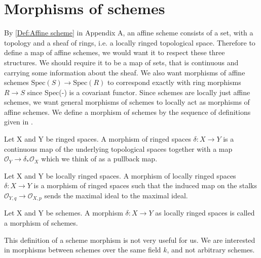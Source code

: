 \section{Morphisms of schemes}
%
By \cref{Def:Affine scheme} in Appendix A, an affine scheme consists of a set, with a topology and a sheaf of rings, i.e. a locally ringed topological space. Therefore to define a map of affine schemes, we would want it to respect these three structures. We should require it to be a map of sets, that is continuous and carrying some information about the sheaf. We also want morphisms of affine schemes \(\text{Spec}(S) \to \text{Spec}(R)\) to correspond exactly with ring morphisms \(R \to S\) since Spec(-) is a covariant functor. Since schemes are locally just affine schemes, we want general morphisms of schemes to locally act as morphisms of affine schemes. We define a morphism of schemes by the sequence of definitions given in  \cite[Def 6.2.1, 6.3.1, 6.3.3]{Vakil}. 

\begin{definition}
Let X and Y be ringed spaces. A morphism of ringed spaces \(\delta : X \to Y \) is a continuous map of the underlying topological spaces together with a map \(\mathcal{O}_{Y} \to \delta_*\mathcal{O}_{X}\) which we think of as a pullback map. 
\end{definition}

\begin{definition}
Let X and Y be locally ringed spaces. A morphism of locally ringed spaces \(\delta : X \to Y \) is a morphism of ringed spaces such that the induced map on the stalks \(\mathcal{O}_{Y, q} \to \mathcal{O}_{X, p}\) sends the maximal ideal to the maximal ideal. 
\end{definition}

\begin{definition}
Let X and Y be schemes. A morphism \(\delta : X \longrightarrow Y \) as locally ringed spaces is called a morphism of schemes. 
\end{definition}

This definition of a scheme morphism is not very useful for us. We are interested in morphisms between schemes over the same field \(k\), and not arbitrary schemes. 

